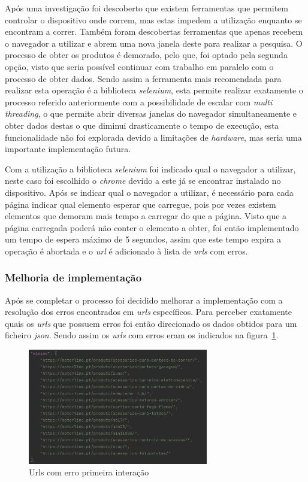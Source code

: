 Após uma investigação foi descoberto que existem ferramentas que permitem controlar o dispositivo onde correm, mas estas impedem a utilização enquanto se encontram a correr. Também foram descobertas ferramentas que apenas recebem o navegador a utilizar e abrem uma nova janela deste para realizar a pesquisa.
O processo de obter os produtos é demorado, pelo que, foi optado pela segunda opção, visto que seria possível continuar com trabalho em paralelo com o processo de obter dados. Sendo assim a ferramenta mais recomendada para realizar esta operação é a biblioteca \textit{selenium}, esta  permite realizar exatamente o processo referido anteriormente com a possibilidade de escalar com \textit{multi threading}, o que permite abrir diversas janelas do navegador simultaneamente e obter dados destas o que diminui drasticamente o tempo de execução, esta funcionalidade não foi explorada devido a limitações de \textit{hardware}, mas seria uma importante implementação futura.

Com a utilização a biblioteca \textit{selenium} foi indicado qual o navegador a utilizar, neste caso foi escolhido o \textit{chrome} devido a este já se encontrar instalado no dispositivo. Após se indicar qual o navegador a utilizar, é necessário para cada página indicar qual elemento esperar que carregue, pois por vezes existem elementos que demoram mais tempo a carregar do que a página. Visto que a página carregada poderá não conter o elemento a obter, foi então implementado um tempo de espera máximo de 5 segundos, assim que este tempo expira a operação é abortada e o \textit{url} é adicionado à lista de \textit{urls} com erros.

\newpage


\subsubsection{Melhoria de implementação}

Após se completar o processo foi decidido melhorar a implementação com a resolução dos erros encontrados em \textit{urls} específicos. Para perceber exatamente quais os \textit{urls}
que possuem erros foi então direcionado os dados obtidos para um ficheiro \textit{json}. Sendo assim os \textit{urls} com erros eram os indicados na figura~\ref{fig:57}.

\begin{figure}[htb]
    \centering
    
    \includegraphics[width=0.7\textwidth]{images/implementacao/scraper/urls_erro_iteracao_1.png}
    \caption{Urls com erro primeira interação}
    \label{fig:57}
\end{figure}

